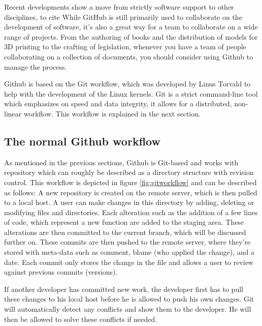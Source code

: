 \documentclass[fleqn,10pt]{SelfArx} %
\begin{document}
Recent developments show a move from strictly software support to other disciplines, to cite \citeauthor{peter_bell_introducing_2015} \cite{peter_bell_introducing_2015} While GitHub is still primarily used to collaborate on the development of software, it’s also a great way for a team to collaborate on a wide range of projects. From the authoring of books and the distribution of models for 3D printing to the crafting of legislation, whenever you have a team of people collaborating on a collection of documents, you should consider using Github to manage the process.

Github is based on the Git workflow, which was developed by Linus Torvald to help with the development of the Linux kernels. Git is a strict command-line tool which emphasizes on speed and data integrity, it allows for a distributed, non-linear workflow. This workflow is explained in the next section.

\subsection{The normal Github workflow}
As mentioned in the previous sections, Github is Git-based and works with repository which can roughly be described as a directory structure with revision control. This workflow is depicted in figure \ref{fig:gitworkflow} and can be described as follows: A new repository is created on the remote server, which is then pulled to a local host. A user can make changes in this directory by adding, deleting or modifying files and directories. Each alteration such as the addition of a few lines of code, which represent a new function are added to the staging area. These alterations are then committed to the current branch, which will be discussed further on. These commits are then pushed to the remote server, where they're stored with meta-data such as comment, blame (who applied the change), and a date. Each commit only stores the change in the file and allows a user to review against previous commits (versions). 

If another developer has committed new work, the developer first has to pull these changes to his local host before he is allowed to push his own changes. Git will automatically detect any conflicts and show them to the developer. He will then be allowed to solve these conflicts if needed.
\end{document}
